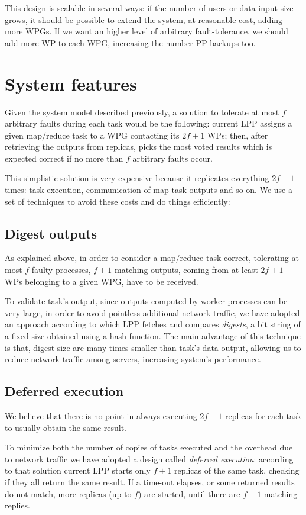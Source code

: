 \documentclass[sigchi]{acmart}
\begin{document}
This design is scalable in several ways: if the number of users or data input size grows, it should be possible to extend the system, at reasonable cost, adding more WPGs. If we want an higher level of arbitrary fault-tolerance, we should add more WP to each WPG, increasing the number PP backups too.

\section{System features}

Given the system model described previously, a solution to tolerate at most $f$ arbitrary faults during each task would be the following: current LPP assigns a given map/reduce task to a WPG contacting its $2f + 1$ WPs; then, after retrieving the outputs from replicas, picks the most voted results which is expected correct if no more than $f$ arbitrary faults occur. 

This simplistic solution is very expensive because it replicates everything $2f + 1$ times: task execution, communication of map task outputs and so on. We use a set of techniques to avoid these costs and do things efficiently:

\subsection{Digest outputs} As explained above, in order to consider a map/reduce task correct, tolerating at most $f$ faulty processes, $f + 1$ matching outputs, coming from at least $2f + 1$ WPs belonging to a given WPG,  have to be received. 

To validate task's output, since outputs computed by worker processes can be very large, in order to avoid pointless additional network traffic, we have adopted an approach according to which LPP fetches and compares \textit{digests}, a bit string of a fixed size obtained using a hash function. The main advantage of this technique is that, digest size are many times smaller than task's data output, allowing us to reduce network traffic among servers, increasing system's performance.

\subsection{Deferred execution} We believe that there is no point in always executing $2f + 1$ replicas for each task to usually obtain the same result. 

To minimize both the number of copies of tasks executed and the overhead due to network traffic we have adopted a design called \textit{deferred execution}: according to that solution current LPP starts only $f + 1$ replicas of the same task, checking if they all return the same result. If a time-out elapses, or some returned results do not match, more replicas (up to $f$) are started, until there are $f + 1$ matching replies. 
\end{document}
